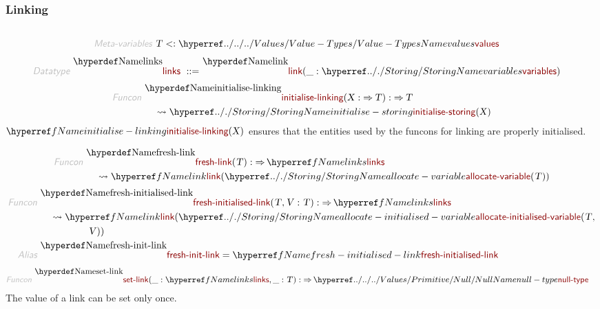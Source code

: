 \subsubsection*{Linking}\hypertarget{linking}{}\label{linking}

\begin{align*}
  [ ~ 
  \KEY{Datatype} ~ & \NAMEREF{links} \\
  \KEY{Funcon} ~ & \NAMEREF{initialise-linking} \\
  \KEY{Funcon} ~ & \NAMEREF{link} \\
  \KEY{Funcon} ~ & \NAMEREF{fresh-link} \\
  \KEY{Funcon} ~ & \NAMEREF{fresh-initialised-link} \\
  \KEY{Alias} ~ & \NAMEREF{fresh-init-link} \\
  \KEY{Funcon} ~ & \NAMEREF{set-link} \\
  \KEY{Funcon} ~ & \NAMEREF{follow-if-link}
  ~ ]
\end{align*}
\begin{align*}
  \KEY{Meta-variables} ~ 
  & \VAR{T} <: \NAMEHYPER{../../../Values}{Value-Types}{values}
\end{align*}
\begin{align*}
  \KEY{Datatype} ~ 
  \NAMEDECL{links}  
  ~ ::= ~ & \NAMEDECL{link} (\_ : \NAMEHYPER{../.}{Storing}{variables})
\end{align*}
\begin{align*}
  \KEY{Funcon} ~ 
  & \NAMEDECL{initialise-linking}(\VAR{X} :  \TO \VAR{T}) :  \TO \VAR{T} \\
  & \quad \leadsto \NAMEHYPER{../.}{Storing}{initialise-storing}
                     ( \VAR{X} )
\end{align*}
$\SHADE{\NAMEREF{initialise-linking}
           ( \VAR{X} )}$ ensures that the entities used by the funcons for
  linking are properly initialised.

\begin{align*}
  \KEY{Funcon} ~ 
  & \NAMEDECL{fresh-link}(\VAR{T} ) :  \TO \NAMEREF{links} \\
  & \quad \leadsto \NAMEREF{link}
                     ( \NAMEHYPER{../.}{Storing}{allocate-variable}
                         ( \VAR{T} ) )
\end{align*}
\begin{align*}
  \KEY{Funcon} ~ 
  & \NAMEDECL{fresh-initialised-link}(\VAR{T} , \VAR{V} : \VAR{T}) :  \TO \NAMEREF{links} \\
  & \quad \leadsto \NAMEREF{link}
                     ( \NAMEHYPER{../.}{Storing}{allocate-initialised-variable}
                         ( \VAR{T}, \\&\quad \quad \quad \quad \quad 
                           \VAR{V} ) )
\\
  \KEY{Alias} ~ 
  & \NAMEDECL{fresh-init-link} = \NAMEREF{fresh-initialised-link}
\end{align*}
\begin{align*}
  \KEY{Funcon} ~ 
  & \NAMEDECL{set-link}(\_ : \NAMEREF{links}, \_ : \VAR{T}) :  \TO \NAMEHYPER{../../../Values/Primitive}{Null}{null-type}
\end{align*}
The value of a link can be set only once.

